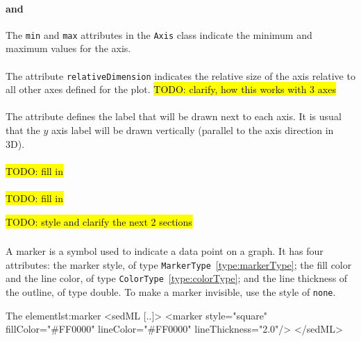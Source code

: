 \paragraph*{ and }
The {\tt min} and {\tt max} attributes in the {\tt Axis} class indicate the minimum and maximum values for the axis. 

\paragraph*{}
The attribute {\tt relativeDimension} indicates the relative size of the axis relative to all other axes defined for the plot.
\hl{TODO: clarify, how this works with 3 axes}


\paragraph*{}
The attribute  defines the label that will be drawn next to each axis. It is usual that the $y$ axis label will be drawn vertically (parallel to the axis direction in 3D).  

\paragraph*{}
\hl{TODO: fill in}

\paragraph*{}
\hl{TODO: fill in}


\hl{TODO: style and clarify the next 2 sections}
\subsubsection{}
\label{class:marker}
A marker is a symbol used to indicate a data point on a graph. It has four attributes: the marker style, of type {\tt MarkerType}~\ref{type:markerType}; the fill color and the line color, of type {\tt ColorType}~\ref{type:colorType}; and the line thickness of the outline, of type double. To make a marker invisible, use the style of {\tt none}.

\begin{myXmlLst}{The  element}{lst:marker}
<sedML [..]>
 <marker style="square" fillColor="#FF0000" lineColor="#FF0000" lineThickness="2.0"/>
</sedML>
\end{myXmlLst}

